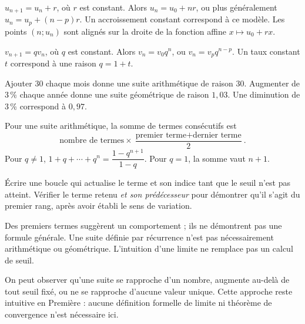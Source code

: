 \clearpage
{}
\begin{definition}
$u_{n+1}=u_n+r$, où $r$ est constant. Alors $u_n=u_0+nr$, ou plus généralement
$u_n=u_p+(n-p)r$. Un accroissement constant correspond à ce modèle.
Les points $(n;u_n)$ sont alignés sur la droite de la fonction affine $x\mapsto u_0+rx$.
\end{definition}
\begin{definition}
$v_{n+1}=qv_n$, où $q$ est constant. Alors $v_n=v_0q^n$, ou
$v_n=v_pq^{n-p}$. Un taux constant $t$ correspond à une raison $q=1+t$.
\end{definition}
\begin{exemple}
Ajouter 30 chaque mois donne une suite arithmétique de raison 30.
Augmenter de 3\,\% chaque année donne une suite géométrique de raison $1{,}03$.
Une diminution de 3\,\% correspond à $0{,}97$.
\end{exemple}
\begin{theoreme}
Pour une suite arithmétique, la somme de termes consécutifs est
\[\text{nombre de termes}\times\frac{\text{premier terme}+\text{dernier terme}}2.\]
Pour $q\neq1$, $1+q+\cdots+q^n=\dfrac{1-q^{n+1}}{1-q}$.
Pour $q=1$, la somme vaut $n+1$.
\end{theoreme}
\begin{savoirfaire}
Écrire une boucle qui actualise le terme et son indice tant que le seuil n'est
pas atteint. Vérifier le terme retenu \emph{et son prédécesseur} pour démontrer
qu'il s'agit du premier rang, après avoir établi le sens de variation.
\end{savoirfaire}
\begin{attention}
Des premiers termes suggèrent un comportement ; ils ne démontrent pas une
formule générale. Une suite définie par récurrence n'est pas nécessairement
arithmétique ou géométrique. L'intuition d'une limite ne remplace pas un calcul de seuil.
\end{attention}
\clearpage
{}
\begin{definition}
On peut observer qu'une suite se rapproche d'un nombre, augmente au-delà
de tout seuil fixé, ou ne se rapproche d'aucune valeur unique. Cette approche
reste intuitive en Première : aucune définition formelle de limite ni
théorème de convergence n'est nécessaire ici.
\end{definition}
